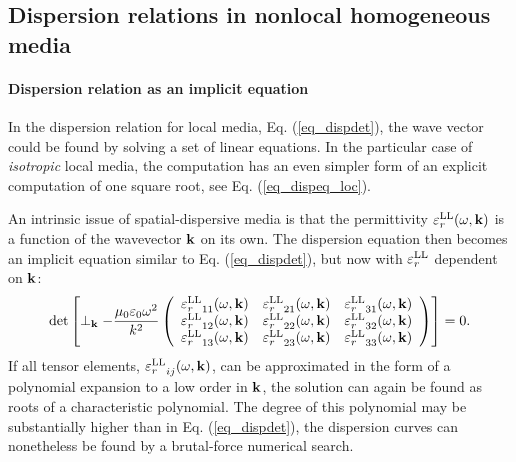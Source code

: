 \subsection{Dispersion relations in nonlocal homogeneous media} 
\paragraph{Dispersion relation as an implicit equation} %
In the dispersion relation for local media, Eq. (\ref{eq_dispdet}), the wave vector could be found by solving a set of linear equations. In the particular case of \textit{isotropic} local media, the computation has an even simpler form of an explicit computation of one square root, see Eq. (\ref{eq_dispeq_loc}).

An intrinsic issue of spatial-dispersive media is that the permittivity $\varepsilon_r^\text{LL}(\omega,{\mathbf{k}})$ is a function of the wavevector ${\mathbf{k}}$ on its own. The dispersion equation then becomes an implicit equation similar to Eq. (\ref{eq_dispdet}), but now with $\varepsilon_r^\text{LL}$ dependent on ${\mathbf{k}}$: 
\begin{equation} 
\det\left[
\perp_{\mathbf{k}} -
	\frac{\mu_0 \varepsilon_0 \omega^2}{k^2}
	\left(\begin{array}{ccc} 
	{\varepsilon_r^\text{LL}}_{11}(\omega,{\mathbf{k}}) & {\varepsilon_r^\text{LL}}_{21}(\omega,{\mathbf{k}}) & {\varepsilon_r^\text{LL}}_{31}(\omega,{\mathbf{k}})  \\
	{\varepsilon_r^\text{LL}}_{12}(\omega,{\mathbf{k}}) & {\varepsilon_r^\text{LL}}_{22}(\omega,{\mathbf{k}}) & {\varepsilon_r^\text{LL}}_{32}(\omega,{\mathbf{k}})  \\
	{\varepsilon_r^\text{LL}}_{13}(\omega,{\mathbf{k}}) & {\varepsilon_r^\text{LL}}_{23}(\omega,{\mathbf{k}}) & {\varepsilon_r^\text{LL}}_{33}(\omega,{\mathbf{k}})  
	\end{array} \right) \right] = 0. \label{eq_dispdetLL}\end{equation}
If all tensor elements, ${\varepsilon_r^\text{LL}}_{ij}(\omega,{\mathbf{k}})$, can be approximated in the form of a polynomial expansion to a low order in ${\mathbf{k}}$, the solution can again be found as roots of a characteristic polynomial. The degree of this polynomial may be substantially higher than in Eq. (\ref{eq_dispdet}), the dispersion curves can nonetheless be found by a brutal-force numerical search. %
